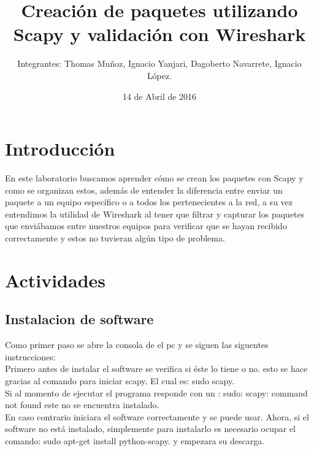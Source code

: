 \documentclass{udpreport}
\title{Creación de paquetes utilizando Scapy y validación con Wireshark}
\author{Integrantes: Thomas Muñoz, Ignacio Yanjari, Dagoberto Navarrete, Ignacio López.}
\date{14 de Abril de 2016}
\begin{document}
\maketitle
\tableofcontents
\chapter{Introducción}
	En este laboratorio buscamos aprender cómo se crean los paquetes con Scapy y como se organizan estos, además de entender la
	diferencia entre enviar un paquete a un equipo específico o a todos los pertenecientes a la red, a su vez entendimos la
	utilidad de Wireshark al tener que filtrar y capturar los paquetes que enviábamos entre nuestros equipos para verificar que se
	hayan recibido correctamente y estos no tuvieran algún tipo de problema.
\chapter{Actividades}
	\section{Instalacion de software}
	Como primer paso se abre la consola de el pc y se siguen las siguentes instrucciones:\\
	Primero antes de instalar el software se  verifica si éste lo tiene o no.
	esto se hace gracias al comando para iniciar scapy. El cual es: sudo scapy.\\
	Si al momento de ejecutar el programa responde con un :  sudo: scapy: command not found 
	este no se encuentra instalado. \\
	En caso contrario iniciara el software correctamente y se puede usar.
	Ahora, si el software no está instalado, simplemente para instalarlo
	es necesario ocupar el comando: sudo apt-get install python-scapy.
	y empezara su descarga.\\
\end{document}
